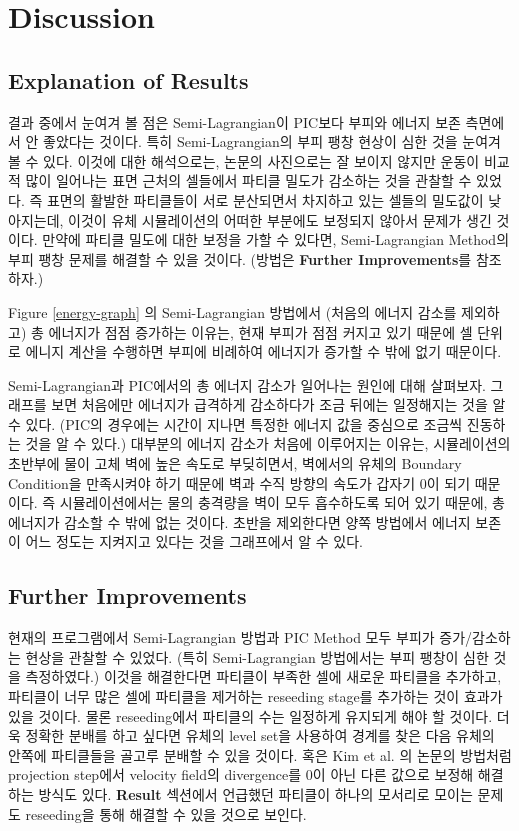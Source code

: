\documentclass[11pt, A4]{article}
\begin{document}
\section{Discussion}

\subsection{Explanation of Results}

결과 중에서 눈여겨 볼 점은 Semi-Lagrangian이 PIC보다 부피와 에너지 보존 측면에서 안 좋았다는 것이다. 특히 Semi-Lagrangian의 부피 팽창 현상이 심한 것을 눈여겨 볼 수 있다. 이것에 대한 해석으로는, 논문의 사진으로는 잘 보이지 않지만 운동이 비교적 많이 일어나는 표면 근처의 셀들에서 파티클 밀도가 감소하는 것을 관찰할 수 있었다. 즉 표면의 활발한 파티클들이 서로 분산되면서 차지하고 있는 셀들의 밀도값이 낮아지는데, 이것이 유체 시뮬레이션의 어떠한 부분에도 보정되지 않아서 문제가 생긴 것이다. 만약에 파티클 밀도에 대한 보정을 가할 수 있다면, Semi-Lagrangian Method의 부피 팽창 문제를 해결할 수 있을 것이다. (방법은 \textbf{Further Improvements}를 참조하자.)

Figure \ref{energy-graph} 의 Semi-Lagrangian 방법에서 (처음의 에너지 감소를 제외하고) 총 에너지가 점점 증가하는 이유는, 현재 부피가 점점 커지고 있기 때문에 셀 단위로 에니지 계산을 수행하면 부피에 비례하여 에너지가 증가할 수 밖에 없기 때문이다.

Semi-Lagrangian과 PIC에서의 총 에너지 감소가 일어나는 원인에 대해 살펴보자. 그래프를 보면 처음에만 에너지가 급격하게 감소하다가 조금 뒤에는 일정해지는 것을 알 수 있다. (PIC의 경우에는 시간이 지나면 특정한 에너지 값을 중심으로 조금씩 진동하는 것을 알 수 있다.) 대부분의 에너지 감소가 처음에 이루어지는 이유는, 시뮬레이션의 초반부에 물이 고체 벽에 높은 속도로 부딪히면서, 벽에서의 유체의 Boundary Condition을 만족시켜야 하기 때문에 벽과 수직 방향의 속도가 갑자기 0이 되기 때문이다. 즉 시뮬레이션에서는 물의 충격량을 벽이 모두 흡수하도록 되어 있기 때문에, 총 에너지가 감소할 수 밖에 없는 것이다. 초반을 제외한다면 양쪽 방법에서 에너지 보존이 어느 정도는 지켜지고 있다는 것을 그래프에서 알 수 있다.

\subsection{Further Improvements}

현재의 프로그램에서 Semi-Lagrangian 방법과 PIC Method 모두 부피가 증가/감소하는 현상을 관찰할 수 있었다. (특히 Semi-Lagrangian 방법에서는 부피 팽창이 심한 것을 측정하였다.) 이것을 해결한다면 파티클이 부족한 셀에 새로운 파티클을 추가하고, 파티클이 너무 많은 셀에 파티클을 제거하는 reseeding stage를 추가하는 것이 효과가 있을 것이다. \cite[p. 117]{fluid-sim-cg} 물론 reseeding에서 파티클의 수는 일정하게 유지되게 해야 할 것이다. 더욱 정확한 분배를 하고 싶다면 유체의 level set을 사용하여 경계를 찾은 다음 유체의 안쪽에 파티클들을 골고루 분배할 수 있을 것이다.  혹은 Kim et al. \cite{volume-preservation} 의 논문의 방법처럼 projection step에서 velocity field의 divergence를 0이 아닌 다른 값으로 보정해 해결하는 방식도 있다. \textbf{Result} 섹션에서 언급했던 파티클이 하나의 모서리로 모이는 문제도 reseeding을 통해 해결할 수 있을 것으로 보인다.
\end{document}
